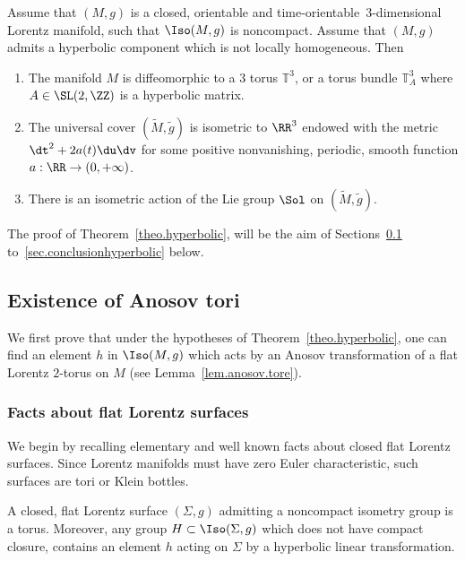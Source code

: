 \begin{theo}\label{theo.hyperbolic}
Assume that $(M,g)$ is a closed, orientable and time-orientable~$3$-dimensional Lorentz manifold, such that $\Iso(M,g)$ is noncompact. Assume that $(M,g)$ admits a hyperbolic component which is not locally homogeneous. Then
\begin{enumerate}
\item \label{list5.2.1}The manifold $M$ is diffeomorphic to a $3$ torus ${\mathbb T}^3$, or a torus bundle ${\mathbb T}_A^3$ where $A \in \SL(2,\ZZ)$ is a hyperbolic matrix.
\item \label{list5.2.2}The universal cover $(\tilde{M},\tilde{g})$ is isometric to $\RR^3$ endowed with the metric $\dt^2+2a(t)\du\dv$ for some positive nonvanishing, periodic, smooth function $a: \RR \to (0,+\infty)$.
\item \label{list5.2.3}There is an isometric action of the Lie group $\Sol$ on $(\tilde{M},\tilde{g})$.
\end{enumerate}
\end{theo}

The proof of Theorem~\ref{theo.hyperbolic}, will be the aim of Sections~\ref{sec.anosovtori} to~\ref{sec.conclusionhyperbolic} below.

\subsection{Existence of Anosov tori}\label{sec.anosovtori}
We first prove that under the hypotheses of Theorem~\ref{theo.hyperbolic}, one can find an element $h$ in $\Iso(M,g)$ which acts by an Anosov transformation of a flat Lorentz $2$-torus on $M$ (see Lemma~\ref{lem.anosov.tore}).

\subsubsection{Facts about flat Lorentz surfaces}
We begin by recalling elementary and well known facts about closed flat Lorentz surfaces. Since Lorentz manifolds must have zero Euler characteristic, such surfaces are tori or Klein bottles.
\begin{lemm}\label{lem.lorentzsurface}
A closed, flat Lorentz surface $(\Sigma,g)$ admitting a noncompact isometry group is a torus. Moreover, any group $H \subset \Iso(\Sigma,g)$ which does not have compact closure, contains an element $h$ acting on $\Sigma$ by a hyperbolic linear transformation.
\end{lemm}

